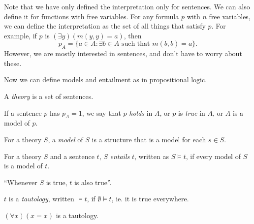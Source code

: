 \documentclass[a4paper]{article}
\begin{document}
Note that we have only defined the interpretation only for sentences. We can also define it for functions with free variables. For any formula $p$ with $n$ free variables, we can define the interpretation as the set of all things that satisfy $p$. For example, if $p$ is $(\exists y)(m(y, y) = a)$, then
\[
  p_A = \{a\in A: \exists b\in A\text{ such that } m(b, b) = a\}.
\]
However, we are mostly interested in sentences, and don't have to worry about these.

Now we can define models and entailment as in propositional logic.
\begin{defi}[Theory]
  A \emph{theory} is a set of sentences.
\end{defi}

\begin{defi}[Model]
  If a sentence $p$ has $p_A = 1$, we say that $p$ \emph{holds} in $A$, or $p$ is \emph{true} in $A$, or $A$ is a model of $p$.

  For a theory $S$, a \emph{model} of $S$ is a structure that is a model for each $s\in S$.
\end{defi}

\begin{defi}
  For a theory $S$ and a sentence $t$, $S$ \emph{entails} $t$, written as $S\models t$, if every model of $S$ is a model of $t$.

  ``Whenever $S$ is true, $t$ is also true''.
\end{defi}

\begin{defi}[Tautology]
  $t$ is a \emph{tautology}, written $\models t$, if $\emptyset\models t$, ie. it is true everywhere.
\end{defi}

\begin{eg}
  $(\forall x)(x = x)$ is a tautology.
\end{eg}
\end{document}
